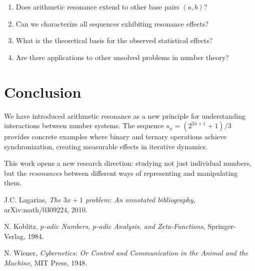 \documentclass[11pt]{article}
\theoremstyle{remark}
\begin{document}
\begin{enumerate}
\item Does arithmetic resonance extend to other base pairs $(a,b)$?
\item Can we characterize all sequences exhibiting resonance effects?
\item What is the theoretical basis for the observed statistical effects?
\item Are there applications to other unsolved problems in number theory?
\end{enumerate}

\section{Conclusion}

We have introduced arithmetic resonance as a new principle for understanding interactions between number systems. The sequence $s_n = (2^{2n+1} + 1)/3$ provides concrete examples where binary and ternary operations achieve synchronization, creating measurable effects in iterative dynamics.

This work opens a new research direction: studying not just individual numbers, but the \emph{resonances} between different ways of representing and manipulating them.

\begin{thebibliography}{9}
J.C. Lagarias, \emph{The $3x+1$ problem: An annotated bibliography}, arXiv:math/0309224, 2010.

N. Koblitz, \emph{$p$-adic Numbers, $p$-adic Analysis, and Zeta-Functions}, Springer-Verlag, 1984.

N. Wiener, \emph{Cybernetics: Or Control and Communication in the Animal and the Machine}, MIT Press, 1948.
\end{thebibliography}
\end{document}
